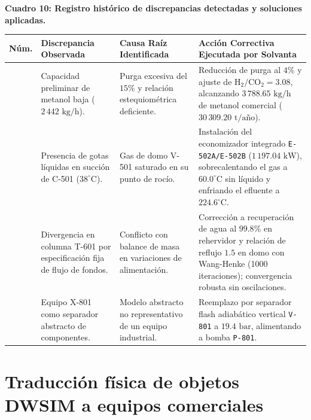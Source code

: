 \documentclass[11pt,letterpaper]{article}
\begin{document}
\begin{center}
\footnotesize
\textbf{Cuadro 10: Registro histórico de discrepancias detectadas y soluciones aplicadas.}\\[3pt]
\begin{tabularx}{\textwidth}{>{\centering\arraybackslash}p{1.1cm} >{\raggedright\arraybackslash}p{3.8cm} >{\raggedright\arraybackslash}p{3.8cm} >{\raggedright\arraybackslash}X}
\toprule
\textbf{Núm.} & \textbf{Discrepancia Observada} & \textbf{Causa Raíz Identificada} & \textbf{Acción Correctiva Ejecutada por Solvanta} \\
\midrule
1 & Capacidad preliminar de metanol baja ($2\,442\text{ kg/h}$). & Purga excesiva del $15\%$ y relación estequiométrica deficiente. & Reducción de purga al $4\%$ y ajuste de $\text{H}_2/\text{CO}_2 = 3.08$, alcanzando $3\,788.65\text{ kg/h}$ de metanol comercial ($30\,309.20\text{ t/año}$). \\
2 & Presencia de gotas líquidas en succión de C-501 ($38^\circ\text{C}$). & Gas de domo V-501 saturado en su punto de rocío. & Instalación del economizador integrado \texttt{E-502A/E-502B} ($1\,197.04\text{ kW}$), sobrecalentando el gas a $60.0^\circ\text{C}$ sin líquido y enfriando el efluente a $224.6^\circ\text{C}$. \\
3 & Divergencia en columna T-601 por especificación fija de flujo de fondos. & Conflicto con balance de masa en variaciones de alimentación. & Corrección a recuperación de agua al $99.8\%$ en rehervidor y relación de reflujo $1.5$ en domo con Wang-Henke (1000 iteraciones); convergencia robusta sin oscilaciones. \\
4 & Equipo X-801 como separador abstracto de componentes. & Modelo abstracto no representativo de un equipo industrial. & Reemplazo por separador flash adiabático vertical \texttt{V-801} a $19.4\text{ bar}$, alimentando a bomba \texttt{P-801}. \\
\bottomrule
\end{tabularx}
\end{center}

\clearpage

\section{Traducción física de objetos DWSIM a equipos comerciales}
\end{document}

